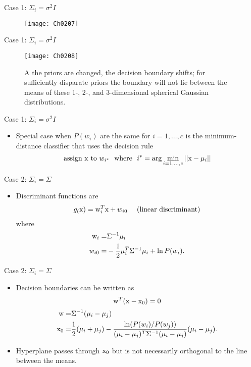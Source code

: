 \begin{frame}{Case 1: $\Sigma_i=\sigma^2 I$}
\begin{figure}
\texttt{[image: Ch0207]}
\end{figure}
\end{frame}

\begin{frame}{Case 1: $\Sigma_i=\sigma^2 I$}
\begin{figure}
\texttt{[image: Ch0208]}
\caption{A the priors are changed, the decision boundary shifts; for sufficiently disparate priors the boundary will not lie between the means of these 1-, 2-, and 3-dimensional spherical Gaussian distributions.}
\end{figure}
\end{frame}

\begin{frame}{Case 1: $\Sigma_i=\sigma^2 I$}
\begin{itemize}
\item Special case when $P(w_i)$ are the same for $i=1,\ldots,c$ is the {\color{red} minimum-distance classifier} that uses the decision rule
\[\text{assign}~{\rm x}~\text{to}~w_{i^*}~~\text{where}~~i^*=\arg\min_{i=1,\ldots,c}||{\rm x}-\mu_i||\]
\end{itemize}
\end{frame}




\begin{frame}{Case 2: $\Sigma_i=\Sigma$}
\begin{itemize}
\item Discriminant functions are
\[g_({\rm x})={\rm w}_i^T{\rm x}+w_{i0}~~~~\text{(linear discriminant)}\]
where
\begin{align*}
{\rm w}_i=&\Sigma^{-1}\mu_i\\
w_{i0}=&-\frac{1}{2}\mu_i^T\Sigma^{-1}\mu_i+\ln P(w_i).
\end{align*}
\end{itemize}
\end{frame}

\begin{frame}{Case 2: $\Sigma_i=\Sigma$}
\begin{itemize}
\item Decision boundaries can be written as
\[{\rm w}^T({\rm x}-{\rm x}_0)=0\]
\begin{align*}
{\rm w}=&\Sigma^{-1}(\mu_i-\mu_j)\\
{\rm x}_{0}=&\frac{1}{2}(\mu_i+\mu_j)-\frac{\ln(P(w_i)/P(w_j))}{(\mu_i-\mu_j)^T\Sigma^{-1}(\mu_i-\mu_j)}(\mu_i-\mu_j).
\end{align*}
\item Hyperplane passes through ${\rm x}_0$ but is not necessarily orthogonal to the line between the means.
\end{itemize}
\end{frame}


